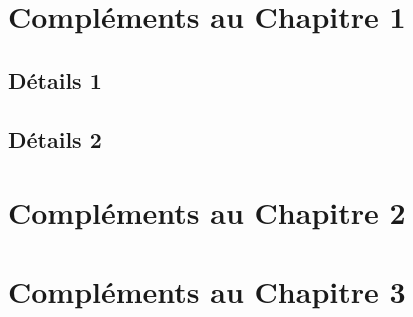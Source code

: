 
\appendix

\chapter{Compléments au Chapitre 1}
\section{Détails 1}\label{append:canal}
\section{Détails 2}\label{append:subAPP}

\chapter{Compléments au Chapitre 2}\label{sec:annCCSDS}
\chapter{Compléments au Chapitre 3}\label{sec:ann3}
